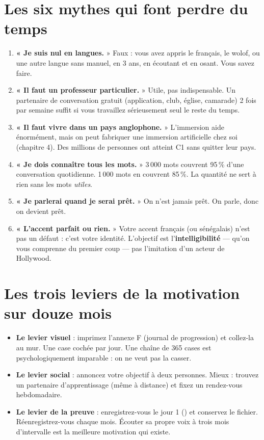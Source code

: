\section{Les six mythes qui font perdre du temps}
\begin{enumerate}
  \item \textbf{« Je suis nul en langues.} » Faux : vous avez appris le français, le wolof,
  ou une autre langue sans manuel, en 3 ans, en écoutant et en osant. Vous savez faire.
  \item \textbf{« Il faut un professeur particulier.} » Utile, pas indispensable. Un
  partenaire de conversation gratuit (application, club, église, camarade) 2 fois par
  semaine suffit si vous travaillez sérieusement seul le reste du temps.
  \item \textbf{« Il faut vivre dans un pays anglophone.} » L'immersion aide énormément,
  mais on peut fabriquer une immersion artificielle chez soi (chapitre 4). Des millions de
  personnes ont atteint C1 sans quitter leur pays.
  \item \textbf{« Je dois connaître tous les mots.} » 3\,000 mots couvrent 95\,\% d'une
  conversation quotidienne. 1\,000 mots en couvrent 85\,\%. La quantité ne sert à rien sans
  les mots \emph{utiles}.
  \item \textbf{« Je parlerai quand je serai prêt.} » On n'est jamais prêt. On parle, donc
  on devient prêt.
  \item \textbf{« L'accent parfait ou rien.} » Votre accent français (ou sénégalais) n'est
  pas un défaut : c'est votre identité. L'objectif est l'\textbf{intelligibilité} --- qu'on
  vous comprenne du premier coup --- pas l'imitation d'un acteur de Hollywood.
\end{enumerate}

\section{Les trois leviers de la motivation sur douze mois}
\begin{itemize}
  \item \textbf{Le levier visuel} : imprimez l'annexe F (journal de progression) et collez-la
  au mur. Une case cochée par jour. Une chaîne de 365 cases est psychologiquement
  imparable : on ne veut pas la casser.
  \item \textbf{Le levier social} : annoncez votre objectif à deux personnes. Mieux :
  trouvez un partenaire d'apprentissage (même à distance) et fixez un rendez-vous hebdomadaire.
  \item \textbf{Le levier de la preuve} : enregistrez-vous le jour 1 ()
  et conservez le fichier. Réenregistrez-vous chaque mois. Écouter sa propre voix à trois
  mois d'intervalle est la meilleure motivation qui existe.
\end{itemize}


